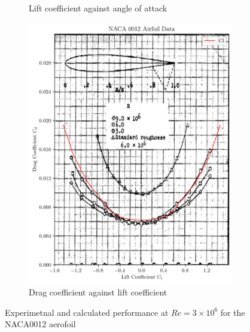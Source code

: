 \documentclass{article}
\begin{document}
\begin{figure}[H]
\begin{subfigure}{0.45\textwidth}
        \caption{Lift coefficient against angle of attack}
        \label{fig:0012_lift_validation}
    \end{subfigure}
    \begin{subfigure}{0.45\textwidth}
        \centering
        \includegraphics[width=0.99\textwidth]{figures/NACA0012_drag_validation.png}
        \caption{Drag coefficient against lift coefficient}
        \label{fig:0012_drag_validation}
    \end{subfigure}
    \caption{Experimetnal and calculated performance at $Re = 3\times10^6$ for the NACA0012 aerofoil}
\end{figure}
\end{document}
